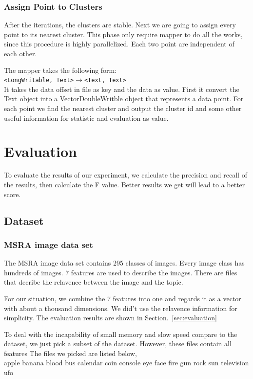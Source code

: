 \documentclass[a4paper,11pt]{article}
\begin{document}
\subsubsection{Assign Point to Clusters}
After the iterations, the clusters are stable. Next we are going to assign every
point to its nearest cluster. This phase only require mapper to do all the
works, since this procedure is highly parallelized. Each two point are
independent of each other.

The mapper takes the following form:\\
\verb|<LongWritable, Text>|$\rightarrow$\verb|<Text, Text>|\\
It takes the data offset in file as key and the data as value. First it convert
the Text object into a VectorDoubleWritble object that represents a data point.
For each point we find the nearest cluster and output the cluster id and some
other useful information for statistic and evaluation as value.

\section{Evaluation}
To evaluate the results of our experiment, we calculate the precision and 
recall of the results, then calculate the F value. Better results we get will 
lead to a better score.

\subsection{Dataset}
\subsubsection{MSRA image data set}
The MSRA image data set contains 295 classes of images. Every image class
has hundreds of images. 7 features are used to describe the images. There are
files that decribe the relavence between the image and the topic.

For our situation, we combine the 7 features into one and regards it as a vector
with about a thousand dimensions. We did't use the relavence information for
simplicity. The evaluation results are shown in Section.~\ref{sec:evaluation}

To deal with the incapability of small memory and slow speed compare to the
dataset, we just pick a subset of the dataset. However, these files contain all
features The files we picked are listed below,\\
\textsf{apple banana blood bus calendar coin console eye face fire gun rock sun
television ufo}
\end{document}
